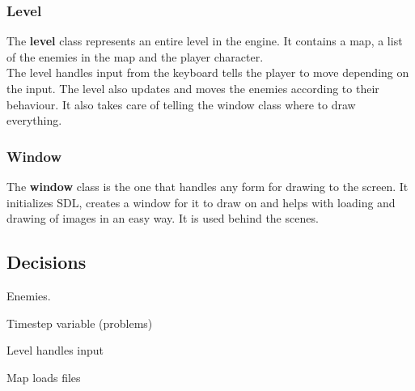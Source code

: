\subsubsection{Level}
\label{03_01_04}

The \textbf{level} class represents an entire level in the engine. It contains a map, a list of the enemies in the map and the player character. 
\\The level handles input from the keyboard tells the player to move depending on the input. The level also updates and moves the enemies according to their behaviour. It also takes care of telling the window class where to draw everything.

\subsubsection{Window}
\label{03_01_05}

The \textbf{window} class is the one that handles any form for drawing to the screen. It initializes SDL, creates a window for it to draw on and helps with loading and drawing of images in an easy way. It is used behind the scenes.



\subsection{Decisions}
\label{03_02}

Enemies.

Timestep variable (problems)

Level handles input

Map loads files

